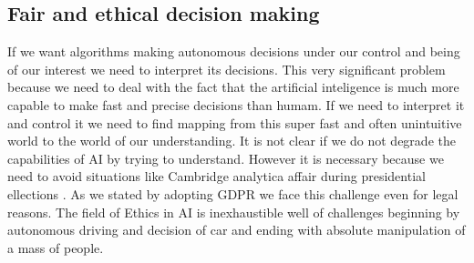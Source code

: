 \subsection{Fair and ethical decision making}
If we want algorithms making autonomous decisions under our control and being of our interest we need to interpret its decisions. This very significant problem because we need to deal with the fact that the artificial inteligence is much more capable to make fast and precise decisions than humam. If we need to interpret it and control it we need to find mapping from this super fast and often unintuitive world to the world of our understanding. It is not clear if we do not degrade the capabilities of AI by trying to understand. However it is necessary because we need to avoid situations like Cambridge analytica affair during presidential ellections \cite{Boldyreva2018}. As we stated by adopting GDPR we face this challenge even for legal reasons. The field of Ethics in AI \cite{Siau2020} is inexhaustible well of challenges beginning by autonomous driving and decision of car and ending with absolute manipulation of a mass of people.





